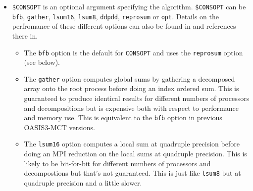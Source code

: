 \begin{itemize}
\begin{itemize}
\begin{itemize}
    \item with {\tt \$CMETH = BASPOS}, the operation is analgous to
      {\tt GLBPOS} as a multiplicative term except the non masked surface of the
      source and the target grids are taken into account and the
      residual is distributed proportionally to the value of the
      original field; this option does not ensure global
      conservation of the field but ensures that the energy received
      is proportional to the non masked surface of the target grid and
      it does not change the sign of the field if the field is well behaved.
    \item with {\tt \$CMETH = BSSPOS}, the same operation as {\tt BASPOS} is performed
      except that the multiplicative term is computed separately for positive
      and negative values of the field; this option has the same characteristics
      as {\tt BASPOS} except it does not change the sign of the field, but is
      more expensive because many extra global sums are required; 
      this should be used in cases where the area averaged field value tends to 0
      as these cases can generate poor corrections, even leading
      to changes of sign, when carried out with the {\tt BASPOS} option.
    \end{itemize}
  \item {\tt \$CONSOPT} is an optional argument specifying the
    algorithm.  {\tt \$CONSOPT} can be {\tt bfb}, {\tt gather}, {\tt lsum16}, {\tt lsum8},
    {\tt ddpdd}, {\tt reprosum} or {\tt opt}. Details on the perfromance of these different options can also be found in \cite{craig17} and references there in.
\begin{itemize}
\item The {\tt bfb} option is the default for {\tt CONSOPT}  and uses the {\tt reprosum} option (see below).
\item The {\tt gather} option computes global sums by gathering a decomposed array
  onto the root process before doing an index ordered sum.  This is guaranteed to produce
  identical results for different numbers of processors and decompositions but is expensive
  both with respect to performance and memory use. This is equivalent to the {\tt bfb} option in previous OASIS3-MCT versions.
\item The {\tt lsum16} option computes a local sum at quadruple precision before doing
  an MPI reduction on the local sums at quadruple precision.  This is likely to be
  bit-for-bit for different numbers of processors and decompostions but that's not guaranteed.
  This is just like {\tt lsum8} but at quadruple precision and a little slower.

\end{itemize}
\end{itemize}
\end{itemize}
